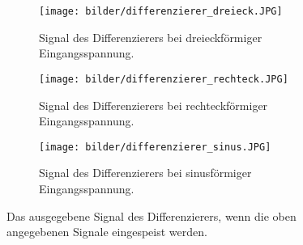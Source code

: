     \begin{figure}
        \centering
        \begin{subfigure}[b]{0.48\textwidth}
            \centering
            \texttt{[image: bilder/differenzierer\_dreieck.JPG]}
            \caption{Signal des Differenzierers bei dreieckförmiger Eingangsspannung.}
            \vspace*{1cm}
            \label{fig:differenzierer_dreieck}
        \end{subfigure}
    
        \begin{subfigure}[b]{0.48\textwidth}
            \centering
            \texttt{[image: bilder/differenzierer\_rechteck.JPG]}
            \caption{Signal des Differenzierers bei rechteckförmiger Eingangsspannung.}
            \vspace*{1cm}
            \label{fig:differenzierer_rechteck}
        \end{subfigure}

        \begin{subfigure}[b]{0.48\textwidth}
            \centering
            \texttt{[image: bilder/differenzierer\_sinus.JPG]}
            \caption{Signal des Differenzierers bei sinusförmiger Eingangsspannung.}
            \label{fig:differenzierer_sinus}
        \end{subfigure}
        \caption{Das ausgegebene Signal des Differenzierers, wenn die oben angegebenen Signale eingespeist werden.}
        \label{fig:differenzierer_signale}
    \end{figure}
    \FloatBarrier

